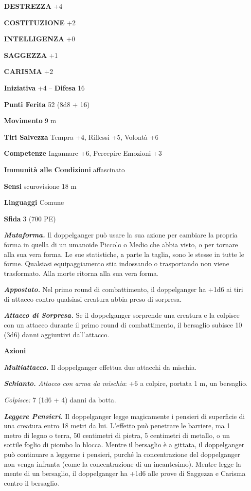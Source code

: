 \begin{multicols}{2}
\textbf{DESTREZZA} +4

\textbf{COSTITUZIONE} +2

\textbf{INTELLIGENZA} +0

\textbf{SAGGEZZA} +1

\textbf{CARISMA} +2

\textbf{Iniziativa} +4 -- \textbf{Difesa} 16

\textbf{Punti Ferita} 52 (8d8 + 16)

\textbf{Movimento} 9 m

\textbf{Tiri Salvezza} Tempra +4, Riflessi +5, Volontà +6

\textbf{Competenze} Ingannare +6, Percepire Emozioni +3

\textbf{Immunità alle Condizioni} affascinato

\textbf{Sensi} scurovisione 18 m

\textbf{Linguaggi} Comune

\textbf{Sfida} 3 (700 PE)

\emph{\textbf{Mutaforma.}} Il doppelganger può usare la sua azione per cambiare la propria forma in quella di un umanoide Piccolo o Medio che abbia visto, o per tornare alla sua vera forma. Le sue statistiche, a parte la taglia, sono le stesse in tutte le forme. Qualsiasi equipaggiamento stia indossando o trasportando non viene trasformato. Alla morte ritorna alla sua vera forma.

\emph{\textbf{Appostato.}} Nel primo round di combattimento, il doppelganger ha +1d6 ai tiri di attacco contro qualsiasi creatura abbia preso di sorpresa.

\emph{\textbf{Attacco di Sorpresa.}} Se il doppelganger sorprende una creatura e la colpisce con un attacco durante il primo round di combattimento, il bersaglio subisce 10 (3d6) danni aggiuntivi dall'attacco.

\textbf{Azioni}

\emph{\textbf{Multiattacco.}} Il doppelganger effettua due attacchi da
mischia.

\emph{\textbf{Schianto.} Attacco con arma da mischia}: +6 a colpire,
portata 1 m, un bersaglio.

\emph{Colpisce:} 7 (1d6 + 4) danni da botta.

\emph{\textbf{Leggere Pensieri.}} Il doppelganger legge magicamente i pensieri di superficie di una creatura entro 18 metri da lui. L'effetto può penetrare le barriere, ma 1 metro di legno o terra, 50 centimetri di pietra, 5 centimetri di metallo, o un sottile foglio di piombo lo blocca. Mentre il bersaglio è a gittata, il doppelganger può continuare a leggerne i pensieri, purché la concentrazione del doppelganger non venga infranta (come la concentrazione di un incantesimo). Mentre legge la mente di un bersaglio, il doppelganger ha +1d6 alle prove di Saggezza e Carisma contro il bersaglio.


\end{multicols}
